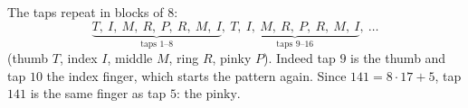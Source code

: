 The taps repeat in blocks of $8$:
\[
\underbrace{T,\ I,\ M,\ R,\ P,\ R,\ M,\ I}_{\text{taps }1\text{--}8},\ \underbrace{T,\ I,\ M,\ R,\ P,\ R,\ M,\ I}_{\text{taps }9\text{--}16},\ \dots
\]
(thumb $T$, index $I$, middle $M$, ring $R$, pinky $P$). Indeed tap $9$ is the thumb and tap $10$ the index finger, which starts the pattern again. Since $141=8\cdot17+5$, tap $141$ is the same finger as tap $5$: the $\boxed{\text{pinky}}$.
